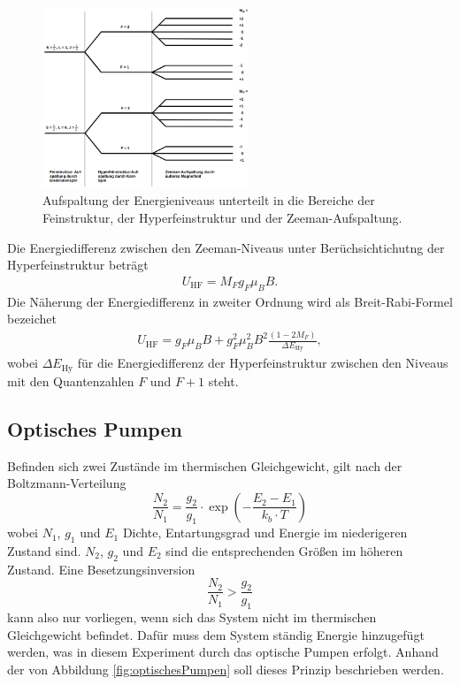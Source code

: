 \begin{figure}
	\centering
	\includegraphics[width=0.55\textwidth]{img/Aufspaltung.png}
	\caption{Aufspaltung der Energieniveaus unterteilt in die Bereiche der Feinstruktur, der Hyperfeinstruktur und der Zeeman-Aufspaltung.}
	\label{fig:Aufspaltung}
\end{figure}

Die Energiedifferenz zwischen den Zeeman-Niveaus unter Berüchsichtichutng der Hyperfeinstruktur beträgt
\begin{align}
	U_\textrm{HF}=M_F g_F\mu_BB.
	\label{eq:8}
\end{align}
Die Näherung der Energiedifferenz in zweiter Ordnung wird als Breit-Rabi-Formel bezeichet
\begin{align}
	U_\textrm{HF}=g_F\mu_BB+g_F^2\mu_B^2B^2\frac{(1-2M_F)}{\Delta E_\textrm{Hy}},
	\label{eq:16}
\end{align}
wobei $\Delta E_\textrm{Hy}$ für die Energiedifferenz der Hyperfeinstruktur zwischen den Niveaus mit den Quantenzahlen $F$ und $F+1$ steht.

\subsection{Optisches Pumpen}
\label{sec:optischesPumpen}

Befinden sich zwei Zustände im thermischen Gleichgewicht, gilt nach der Boltzmann-Verteilung
\begin{equation}
\frac{N_2}{N_1} = \frac{g_2}{g_1} \cdot \exp(-\frac{E_2-E_1}{k_b \cdot T})
\end{equation}
wobei $N_1$, $g_1$ und $E_1$ Dichte, Entartungsgrad und Energie im niederigeren Zustand sind.
$N_2$, $g_2$ und $E_2$ sind die entsprechenden Größen im höheren Zustand.
Eine Besetzungsinversion
\begin{equation*}
	\frac{N_2}{N_1} > \frac{g_2}{g_1}
\end{equation*}
kann also nur vorliegen, wenn sich das System nicht im thermischen Gleichgewicht befindet.
Dafür muss dem System ständig Energie hinzugefügt werden, was in diesem Experiment durch das optische Pumpen erfolgt.
Anhand der von Abbildung \ref{fig:optischesPumpen} soll dieses Prinzip beschrieben werden.

